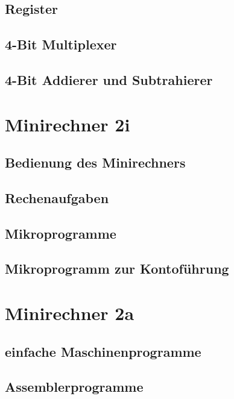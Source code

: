 \documentclass[paper=a4, fontsize=11pt]{scrartcl}
\numberwithin{equation}{section}
\numberwithin{figure}{section}
\numberwithin{table}{section}
\begin{document}
\subsection{Register}

\subsection{4-Bit Multiplexer}

\subsection{4-Bit Addierer und Subtrahierer}


\newpage

\section{Minirechner 2i}

\subsection{Bedienung des Minirechners}

\subsection{Rechenaufgaben}

\subsection{Mikroprogramme}

\subsection{Mikroprogramm zur Kontoführung}


\newpage

\section{Minirechner 2a}

\subsection{einfache Maschinenprogramme}

\subsection{Assemblerprogramme}
\end{document}
